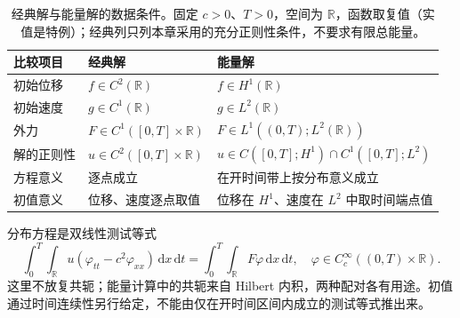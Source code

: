 \begin{table}[htbp]
\centering
\small
\setlength{\tabcolsep}{5pt}
\caption[经典解与能量解的数据条件]{经典解与能量解的数据条件。固定 \(c>0\)、\(T>0\)，空间为 \(\mathbb R\)，函数取复值（实值是特例）；经典列只列本章采用的充分正则性条件，不要求有限总能量。}
\label{b2:tab:09-solution-classes}
\begin{tabularx}{\linewidth}{@{}>{\raggedright\arraybackslash}p{2.0cm}>{\raggedright\arraybackslash}X>{\raggedright\arraybackslash}X@{}}
\toprule
比较项目 & 经典解 & 能量解 \\
\midrule
初始位移 & \(f\in C^2(\mathbb R)\) & \(f\in H^1(\mathbb R)\) \\
初始速度 & \(g\in C^1(\mathbb R)\) & \(g\in L^2(\mathbb R)\) \\
外力 & \(F\in C^1([0,T]\times\mathbb R)\) & \(F\in L^1((0,T);L^2(\mathbb R))\) \\
解的正则性 & \(u\in C^2([0,T]\times\mathbb R)\) & \(u\in C([0,T];H^1)\cap C^1([0,T];L^2)\) \\
方程意义 & 逐点成立 & 在开时间带上按分布意义成立 \\
初值意义 & 位移、速度逐点取值 & 位移在 \(H^1\)、速度在 \(L^2\) 中取时间端点值 \\
\bottomrule
\end{tabularx}
\end{table}

分布方程是双线性测试等式
\[
 \int_0^T\int_{\mathbb R}u(\varphi_{tt}-c^2\varphi_{xx})\,\mathrm{d}x\,\mathrm{d}t
 =\int_0^T\int_{\mathbb R}F\varphi\,\mathrm{d}x\,\mathrm{d}t,
 \quad \varphi\in C_c^\infty((0,T)\times\mathbb R).
\]
这里不放复共轭；能量计算中的共轭来自 Hilbert 内积，两种配对各有用途。初值通过时间连续性另行给定，不能由仅在开时间区间内成立的测试等式推出来。

